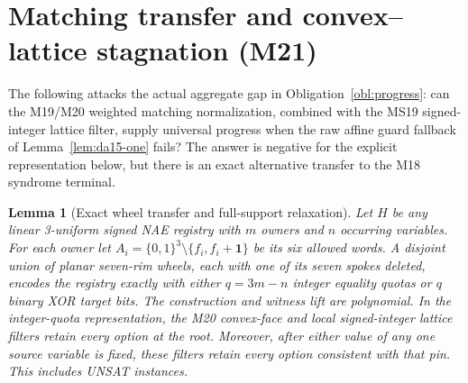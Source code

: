\documentclass[11pt]{article}
\newtheorem{lemma}[theorem]{Lemma}
\begin{document}
\section{Matching transfer and convex--lattice stagnation (M21)}\label{sec:m21}
The following attacks the actual aggregate gap in Obligation~\ref{obl:progress}: can the M19/M20 weighted matching normalization, combined with the MS19 signed-integer lattice filter, supply universal progress when the raw affine guard fallback of Lemma~\ref{lem:da15-one} fails? The answer is negative for the explicit representation below, but there is an exact alternative transfer to the M18 syndrome terminal.

\begin{lemma}[Exact wheel transfer and full-support relaxation]\label{lem:m21-wheel}
Let $H$ be any linear 3-uniform signed NAE registry with $m$ owners and $n$ occurring variables. For each owner let $A_i=\{0,1\}^3\setminus\{f_i,f_i+\mathbf1\}$ be its six allowed words. A disjoint union of planar seven-rim wheels, each with one of its seven spokes deleted, encodes the registry exactly with either $q=3m-n$ integer equality quotas or $q$ binary XOR target bits. The construction and witness lift are polynomial. In the integer-quota representation, the M20 convex-face and local signed-integer lattice filters retain every option at the root. Moreover, after either value of any one source variable is fixed, these filters retain every option consistent with that pin. This includes UNSAT instances.
\end{lemma}
\end{document}
